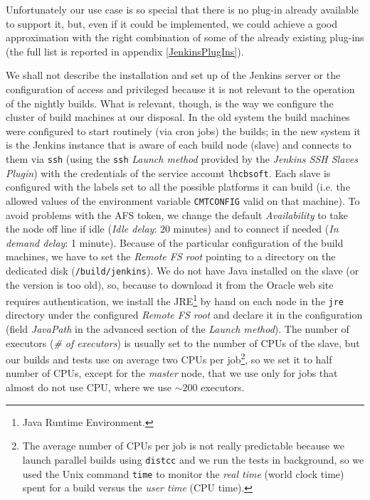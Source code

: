 \documentclass{lhcbnote}
\begin{document}
Unfortunately our use case is so special that there is no plug-in already
available to support it, but, even if it could be implemented, we could achieve
a good approximation with the right combination of some of the already existing
plug-ins (the full list is reported in appendix \ref{JenkinsPlugIns}).

We shall not describe the installation and set up of the Jenkins server or the
configuration of access and privileged because it is not relevant to the
operation of the nightly builds.  What is relevant, though, is the way we
configure the cluster of build machines at our disposal.  In the old system the
build machines were configured to start routinely (via cron jobs) the builds; in
the new system it is the Jenkins instance that is aware of each build node
(slave) and connects to them via \texttt{ssh} (using the \texttt{ssh}
\emph{Launch method} provided by the \emph{Jenkins SSH Slaves Plugin}) with the
credentials of the service account \texttt{lhcbsoft}.  Each slave is configured
with the labels set to all the possible platforms it can build (i.e. the allowed
values of the environment variable \texttt{CMTCONFIG} valid on that machine).
To avoid problems with the AFS token, we change the default \emph{Availability}
to take the node off line if idle (\emph{Idle delay}: 20 minutes) and to connect
if needed (\emph{In demand delay}: 1 minute).  Because of the particular
configuration of the build machines, we have to set the \emph{Remote FS root}
pointing to a directory on the dedicated disk (\texttt{/build/jenkins}).  We do
not have Java installed on the slave (or the version is too old), so, because to
download it from the Oracle web site requires authentication, we install the
JRE\footnote{Java Runtime Environment\cite{JRE}.} by hand on each node in the
\texttt{jre} directory under the configured \emph{Remote FS root} and declare it
in the configuration (field \emph{JavaPath} in the advanced section of the
\emph{Launch method}).  The number of executors (\emph{\# of executors}) is
usually set to the number of CPUs of the slave, but our builds and tests use on
average two CPUs per job\footnote{The average number of CPUs per job is not
  really predictable because we launch parallel builds using
  \texttt{distcc}\cite{distcc,distccCERN} and we run the tests in background, so
  we used the Unix command \texttt{time} to monitor the \emph{real time} (world
  clock time) spent for a build versus the \emph{user time} (CPU time).},
so we set it to half number of CPUs, except for the \emph{master} node, that we
use only for jobs that almost do not use CPU, where we use $\sim200$ executors.
\end{document}
